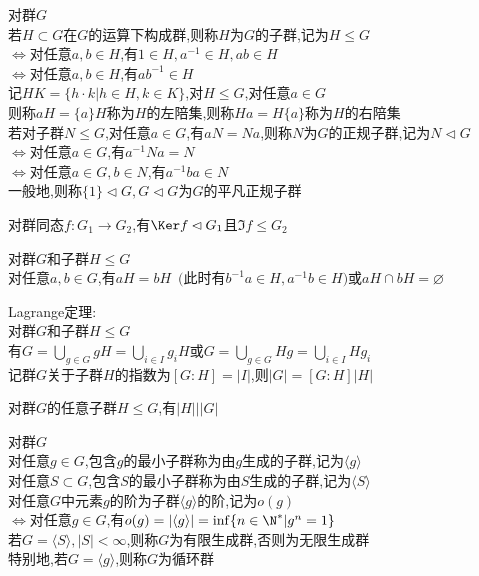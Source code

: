 \begin{dingyi}
对群$G$\\
若$H\subset G$在$G$的运算下构成群,则称$H$为$G$的子群,记为$H\leq G$\\
$\Leftrightarrow$对任意$a,b\in H$,有$1\in H,a^{-1}\in H,ab\in H$\\
$\Leftrightarrow$对任意$a,b\in H$,有$ab^{-1}\in H$\\
记$HK=\{h\cdot k|h\in H,k\in K\}$,对$H\leq G$,对任意$a\in G$\\
则称$aH=\{a\}H$称为$H$的左陪集,则称$Ha=H\{a\}$称为$H$的右陪集\\
若对子群$N\leq G$,对任意$a\in G$,有$aN=Na$,则称$N$为$G$的正规子群,记为$N\lhd G$\\
$\Leftrightarrow$对任意$a\in G$,有$a^{-1}Na=N$\\
$\Leftrightarrow$对任意$a\in G,b\in N$,有$a^{-1}ba\in N$\\
一般地,则称$\{1\}\lhd G,G\lhd G$为$G$的平凡正规子群
\end{dingyi}

\begin{dingli}
对群同态$f:G_1\to G_2$,有$\Ker f\lhd G_1$且$\Im f\leq G_2$
\end{dingli}

\begin{dingli}
对群$G$和子群$H\leq G$\\
对任意$a,b\in G$,有$aH=bH$\ $($此时有$b^{-1}a\in H,a^{-1}b\in H$$)$或$aH\cap bH=\varnothing$
\end{dingli}

\begin{dingli}
Lagrange定理:\\
对群$G$和子群$H\leq G$\\
有$G=\bigcup\limits_{g\in G}gH=\bigcup\limits_{i\in I}g_iH$或$G=\bigcup\limits_{g\in G}Hg=\bigcup\limits_{i\in I}Hg_i$\\
记群$G$关于子群$H$的指数为$[G:H]=|I|$,则$|G|=[G:H]|H|$
\end{dingli}

\begin{zhu}
对群$G$的任意子群$H\leq G$,有$|H|\Big| |G|$
\end{zhu}

\begin{dingyi}
对群$G$\\
对任意$g\in G$,包含$g$的最小子群称为由$g$生成的子群,记为$\langle g\rangle$\\
对任意$S\subset G$,包含$S$的最小子群称为由$S$生成的子群,记为$\langle S\rangle$\\
对任意$G$中元素$g$的阶为子群$\langle g\rangle$的阶,记为$o(g)$\\
$\Leftrightarrow$对任意$g\in G$,有$o(g)=|\langle g\rangle|=\inf\{n\in \N^*|g^n=1\}$\\
若$G=\langle S\rangle,|S|<\infty$,则称$G$为有限生成群,否则为无限生成群\\
特别地,若$G=\langle g\rangle$,则称$G$为循环群
\end{dingyi}

